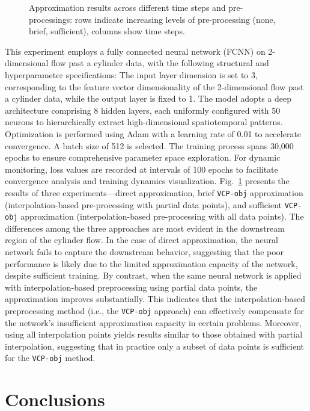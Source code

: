 \documentclass[final]{siamart220329}
\newtheorem{theoretical insights}{Theoretical insights}
\newtheorem{practical takeaway}{Practical takeaway}
\begin{document}
{{{{\begin{figure}[htb]
    \caption{Approximation results across different time steps and pre-processings: rows indicate increasing levels of pre-processing (none, brief, sufficient), columns show time steps.}
    \label{fig:fit_results_pde}
\end{figure}



This experiment employs a fully connected neural network (FCNN) on 2-dimensional flow past a cylinder data, with the following structural and hyperparameter specifications: The input layer dimension is set to 3, corresponding to the feature vector dimensionality of the 2-dimensional flow past a cylinder data, while the output layer is fixed to 1. The model adopts a deep architecture comprising 8 hidden layers, each uniformly configured with 50 neurons to hierarchically extract high-dimensional spatiotemporal patterns. Optimization is performed using Adam with a learning rate of 0.01 to accelerate convergence. A batch size of 512 is selected. The training process spans 30,000 epochs to ensure comprehensive parameter space exploration. For dynamic monitoring, loss values are recorded at intervals of 100 epochs to facilitate convergence analysis and training dynamics visualization.  
Fig.~\ref{fig:fit_results_pde} presents the results of three experiments—direct approximation, brief \texttt{VCP-obj} approximation (interpolation-based pre-processing with partial data points), and sufficient \texttt{VCP-obj} approximation (interpolation-based pre-processing with all data points). The differences among the three approaches are most evident in the downstream region of the cylinder flow. In the case of direct approximation, the neural network fails to capture the downstream behavior, suggesting that the poor performance is likely due to the limited approximation capacity of the network, despite sufficient training. By contrast, when the same neural network is applied with interpolation-based preprocessing using partial data points, the approximation improves substantially. This indicates that the interpolation-based preprocessing method (i.e., the \texttt{VCP-obj} approach) can effectively compensate for the network’s insufficient approximation capacity in certain problems. Moreover, using all interpolation points yields results similar to those obtained with partial interpolation, suggesting that in practice only a subset of data points is sufficient for the \texttt{VCP-obj} method.
 

 


\section{Conclusions}\label{sec7}
 

}}}}
\end{document}
